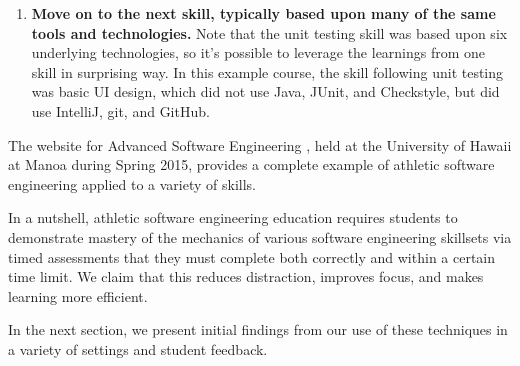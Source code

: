 \begin{enumerate}
\item {\bf Move on to the next skill, typically based upon many of the same tools and technologies.} Note that the unit testing skill was based upon six underlying technologies, so it's possible to leverage the learnings from one skill in surprising way. In this example course, the skill following unit testing was basic UI design, which did not use Java, JUnit, and Checkstyle, but did use IntelliJ, git, and GitHub. 

\end{enumerate} 

The website for Advanced Software Engineering \cite{ics613s15}, held at the University of Hawaii at Manoa during Spring 2015, provides a complete example of athletic software engineering applied to a variety of skills.

In a nutshell, athletic software engineering education requires students to demonstrate mastery of the mechanics of various software engineering skillsets via timed assessments that they must complete both correctly and within a certain time limit.  We claim that this reduces distraction, improves focus, and makes learning more efficient.  

In the next section, we present initial findings from our use of these techniques in a variety of settings and student feedback.
















